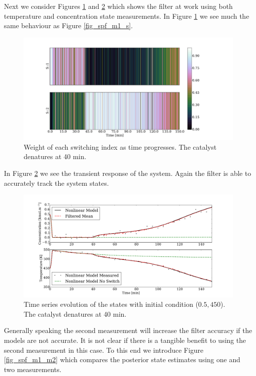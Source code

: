 \documentclass[../masters.tex]{subfiles}
\begin{document}
Next we consider Figures \ref{fig_spf_m2_s} and \ref{fig_spf_m2_t} which shows the filter at work using both temperature and concentration state measurements. In Figure \ref{fig_spf_m2_s} we see much the same behaviour as Figure \ref{fig_spf_m1_s}.
\begin{figure}[H] 
\centering
\includegraphics[scale=0.3]{spf_m2_s.pdf}
\caption{Weight of each switching index as time progresses. The catalyst denatures at 40 min.}
\label{fig_spf_m2_s}
\end{figure}
In Figure \ref{fig_spf_m2_t} we see the transient response of the system. Again the filter is able to accurately track the system states.
\begin{figure}[H] 
\centering
\includegraphics[scale=0.3]{spf_m2_t.pdf}
\caption{Time series evolution of the states with initial condition ($0.5, 450$). The catalyst denatures at 40 min.}
\label{fig_spf_m2_t}
\end{figure}
Generally speaking the second measurement will increase the filter accuracy if the models are not accurate. It is not clear if there is a tangible benefit to using the second measurement in this case. To this end we introduce Figure \ref{fig_spf_m1_m2} which compares the posterior state estimates using one and two measurements. 
\end{document}
